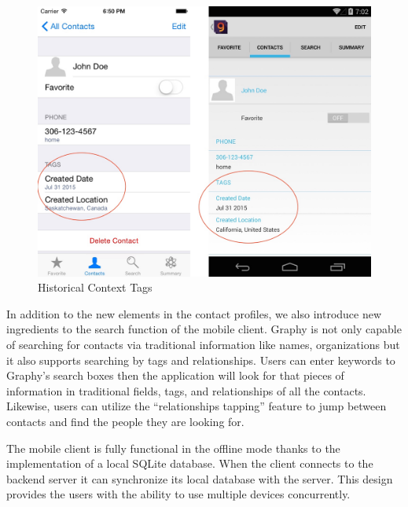 \begin{figure}[!h]
\begin{centering}
\includegraphics[scale=0.3]{pics/graphy_auto_tag.png}
\caption{Historical Context Tags}\label{fg:/graphy_auto_tag}
\end{centering}
\end{figure}

In addition to the new elements in the contact profiles, we also introduce new ingredients to the search function of the mobile client. Graphy is not only capable of searching for contacts via traditional information like names, organizations but it also supports searching by tags and relationships. Users can enter keywords to Graphy's search boxes then the application will look for that pieces of information in traditional fields, tags, and relationships of all the contacts. Likewise, users can utilize the ``relationships tapping'' feature to jump between contacts and find the people they are looking for. 

The mobile client is fully functional in the offline mode thanks to the implementation of a local SQLite database. When the client connects to the backend server it can synchronize its local database with the server. This design provides the users with the ability to use multiple devices concurrently.

